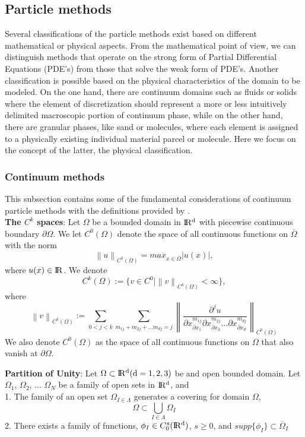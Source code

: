 \documentclass[a4paper,12pt,openany]{book}
\newcommand{\R}{\rm I\!R}
\newcommand{\norm}[1]{\left\lVert#1\right\rVert}
\theoremstyle{break}
\begin{document}
\subsection{Particle methods} \label{sec:particle_method_classification}
Several classifications of the particle methods exist based on different mathematical or physical aspects. From the mathematical point of view, we can distinguish methods that operate on the strong form of Partial Differential Equations (PDE's) from those that solve the weak form of PDE's. Another classification is possible based on the physical characteristics of the domain to be modeled. On the one hand, there are continuum domains such as fluids or solids where the element of discretization should represent a more or less intuitively delimited macroscopic portion of continuum phase, while on the other hand, there are granular phases, like sand or molecules, where each element is assigned to a physically existing individual material parcel or molecule. Here we focus on the concept of the latter, the physical classification.
\subsubsection{Continuum methods}
This subsection contains some of the fundamental considerations of continuum particle methods with the definitions provided by \cite{Shaofan2007}. \\

\textbf{The $C^k$ spaces}: Let $\Omega$ be a bounded domain in $\R^d$ with piecewise continuous boundary $\partial\Omega$. We let $C^0(\Omega)$ denote the space of all continuous functions on $\overline{\Omega}$ with the norm
\begin{equation}
\norm{u}_{C^0(\Omega)}=max_{x\in\overline{\Omega}}|u(x)|,
\end{equation}
where $u(x)\in\R$. We denote
\begin{equation}
C^k(\Omega):=\{v\in C^0\vert\norm{v}_{C^k (\Omega)}<\infty\},
\end{equation}
where
\begin{equation}
\norm{v}_{C^k (\Omega)}:=\sum_{0<j<k}\sum_{m_{1j}+m_{2j}+...m_{dj}=j}\norm{\frac{\partial^j u}{\partial x^{m_{1j}}_{\partial x_1}\partial x^{m_{2j}}_{\partial x_2}...\partial x^{m_{dj}}_{\partial x_d}}}_{C^0(\Omega)}
\end{equation}
We also denote $C^0(\Omega)$ as the space of all continuous functions on $\Omega$ that also vanish at $\partial\Omega$.

\textbf{Partition of Unity}: Let $\Omega \subset \R^d(d=1,2,3)$ be and open bounded domain. Let $\Omega_1$, $\Omega_2$, ... $\Omega_{N}$ be a family of open sets in $\R^d$, and \\
1. The family of an open set ${\Omega}_{I\in\Lambda}$ generates a covering for domain $\Omega$,
\begin{equation}
\Omega\subset\bigcup\limits_{I\in \Lambda} \Omega_I
\end{equation}
2. There exists a family of functions, $\phi_I\in C_0^s(\R^d)$, $s\geq 0$, and $supp\{\phi_I\}\subset \overline{\Omega}_I$
\end{document}
